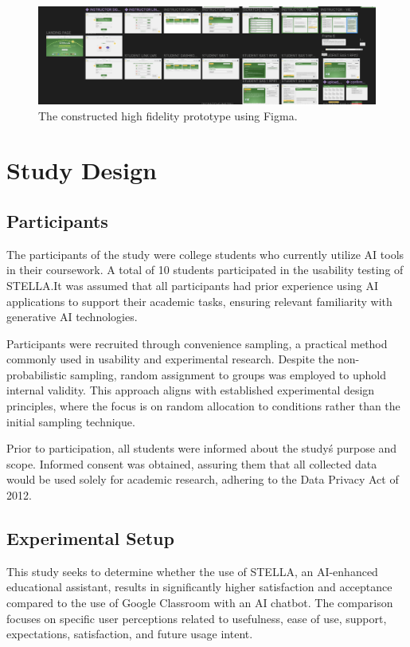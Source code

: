 \documentclass[sigconf,natbib=true]{acmart}
\begin{document}
\begin{figure}[h]
  \centering
  \includegraphics[width=\linewidth]{high_fidelity.png}
  \caption{The constructed high fidelity prototype using Figma.}\label{fig:highfidelity}
\end{figure} 

\section{Study Design}
\subsection{Participants}
The participants of the study were college students who currently utilize AI tools in their coursework. A total of 10 students participated in the usability testing of STELLA.\@ It was assumed that all participants had prior experience using AI applications to support their academic tasks, ensuring relevant familiarity with generative AI technologies.

Participants were recruited through convenience sampling, a practical method commonly used in usability and experimental research. Despite the non-probabilistic sampling, random assignment to groups was employed to uphold internal validity. This approach aligns with established experimental design principles, where the focus is on random allocation to conditions rather than the initial sampling technique. 

Prior to participation, all students were informed about the study\'s purpose and scope. Informed consent was obtained, assuring them that all collected data would be used solely for academic research, adhering to the Data Privacy Act of 2012.

\subsection{Experimental Setup}
This study seeks to determine whether the use of STELLA, an AI-enhanced educational assistant, results in significantly higher satisfaction and acceptance compared to the use of Google Classroom with an AI chatbot. The comparison focuses on specific user perceptions related to usefulness, ease of use, support, expectations, satisfaction, and future usage intent.
\end{document}
